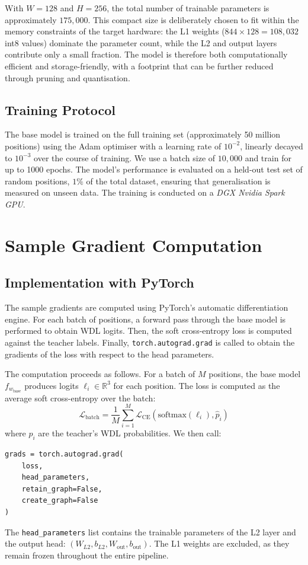 With \(W = 128\) and \(H = 256\), the total number of trainable parameters is approximately \(175{,}000\). This compact size is deliberately chosen to fit within the memory constraints of the target hardware: the L1 weights (\(844 \times 128 = 108{,}032\) int8 values) dominate the parameter count, while the L2 and output layers contribute only a small fraction. The model is therefore both computationally efficient and storage-friendly, with a footprint that can be further reduced through pruning and quantisation.

\subsection{Training Protocol}\label{sec:training-protocol}

The base model is trained on the full training set (approximately 50 million positions) using the Adam optimiser with a learning rate of \(10^{-2}\), linearly decayed to \(10^{-3}\) over the course of training. We use a batch size of \(10{,}000\) and train for up to 1000 epochs. The model's performance is evaluated on a held-out test set of random positions, \(1\%\) of the total dataset, ensuring that generalisation is measured on unseen data. The training is conducted on a \emph{DGX Nvidia Spark GPU}.

\section{Sample Gradient Computation}\label{sec:grad-impl}

\subsection{Implementation with PyTorch}\label{sec:grad-pytorch}

The sample gradients are computed using PyTorch's automatic differentiation engine. For each batch of positions, a forward pass through the base model is performed to obtain WDL logits. Then, the soft cross-entropy loss is computed against the teacher labels. Finally, \texttt{torch.autograd.grad} is called to obtain the gradients of the loss with respect to the head parameters.

The computation proceeds as follows. For a batch of \(M\) positions, the base model \(f_{w_{\mathrm{base}}}\) produces logits \(\ell_i \in \mathbb{R}^3\) for each position. The loss is computed as the average soft cross-entropy over the batch:
\[
\mathcal{L}_{\mathrm{batch}} = \frac{1}{M} \sum_{i=1}^M \mathcal{L}_{\mathrm{CE}}(\mathrm{softmax}(\ell_i), \hat{p}_i)
\]
where \(\hat{p}_i\) are the teacher's WDL probabilities. We then call:
\begin{lstlisting}[basicstyle=\ttfamily\footnotesize,breaklines=true]
grads = torch.autograd.grad(
    loss,
    head_parameters,
    retain_graph=False,
    create_graph=False
)
\end{lstlisting}
The \texttt{head\_parameters} list contains the trainable parameters of the L2 layer and the output head: \((W_{L2}, b_{L2}, W_{\mathrm{out}}, b_{\mathrm{out}})\). The L1 weights are excluded, as they remain frozen throughout the entire pipeline.

